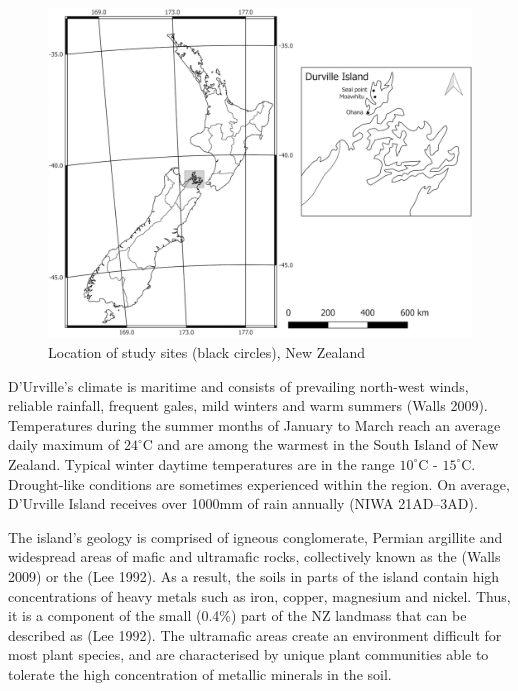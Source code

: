 \begin{figure}
\centering
\includegraphics{figs/Durville.png}
\caption{Location of study sites (black circles), New Zealand{}}
\end{figure}

D'Urville's climate is maritime and consists of prevailing north-west
winds, reliable rainfall, frequent gales, mild winters and warm summers
(Walls 2009). Temperatures during the summer months of January to March
reach an average daily maximum of \(24^{\circ}\)C and are among the
warmest in the South Island of New Zealand. Typical winter daytime
temperatures are in the range \(10^{\circ}\)C - \(15^{\circ}\)C.
Drought-like conditions are sometimes experienced within the region. On
average, D'Urville Island receives over 1000mm of rain annually (NIWA
21AD--3AD).

The island's geology is comprised of igneous conglomerate, Permian
argillite and widespread areas of mafic and ultramafic rocks,
collectively known as the (Walls 2009) or the (Lee 1992). As a result,
the soils in parts of the island contain high concentrations of heavy
metals such as iron, copper, magnesium and nickel. Thus, it is a
component of the small (0.4\%) part of the NZ landmass that can be
described as (Lee 1992). The ultramafic areas create an environment
difficult for most plant species, and are characterised by unique plant
communities able to tolerate the high concentration of metallic minerals
in the soil.

